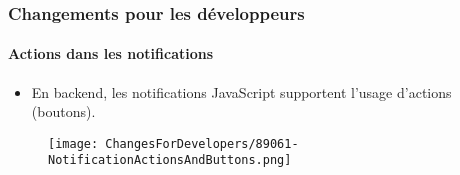 %
%
%
%
%
%
%


\begin{frame}[fragile]
	\frametitle{Changements pour les développeurs}
	\framesubtitle{Actions dans les notifications}

	\begin{itemize}
		\item En backend, les notifications JavaScript supportent l'usage d'actions (boutons).
	\end{itemize}

	\begin{figure}
		\texttt{[image: ChangesForDevelopers/89061-NotificationActionsAndButtons.png]}
	\end{figure}

\end{frame}


